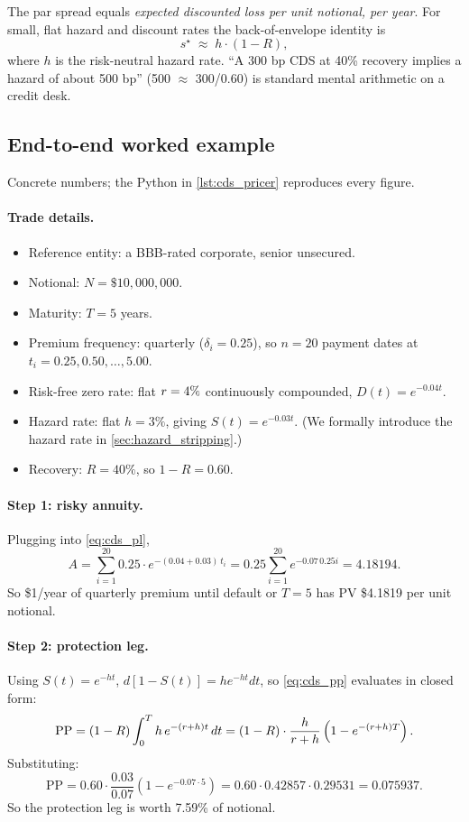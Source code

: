 \begin{intuitionbox}
The par spread equals \emph{expected discounted loss per unit
notional, per year}.  For small, flat hazard and discount rates the
back-of-envelope identity is
\[
  s^\star \;\approx\; h \cdot (1 - R),
\]
where $h$ is the risk-neutral hazard rate.  ``A 300 bp CDS at 40\%
recovery implies a hazard of about 500 bp'' (500 $\approx$ 300/0.60)
is standard mental arithmetic on a credit desk.
\end{intuitionbox}


\subsection{End-to-end worked example}
\label{sec:cds_worked}

Concrete numbers; the Python in \cref{lst:cds_pricer} reproduces
every figure.

\paragraph{Trade details.}
\begin{itemize}
  \item Reference entity: a BBB-rated corporate, senior unsecured.
  \item Notional: $N = \$10{,}000{,}000$.
  \item Maturity: $T = 5$ years.
  \item Premium frequency: quarterly ($\delta_i = 0.25$), so
    $n = 20$ payment dates at $t_i = 0.25, 0.50, \ldots, 5.00$.
  \item Risk-free zero rate: flat $r = 4\%$ continuously compounded,
    $D(t) = e^{-0.04 t}$.
  \item Hazard rate: flat $h = 3\%$, giving
    $S(t) = e^{-0.03 t}$.  (We formally introduce the hazard rate in
    \cref{sec:hazard_stripping}.)
  \item Recovery: $R = 40\%$, so $1 - R = 0.60$.
\end{itemize}

\paragraph{Step 1: risky annuity.}
Plugging into \cref{eq:cds_pl},
\[
  A = \sum_{i=1}^{20} 0.25 \cdot e^{-(0.04 + 0.03)\, t_i}
    = 0.25 \sum_{i=1}^{20} e^{-0.07\, 0.25 i}
    = 4.18194.
\]
So \$1/year of quarterly premium until default or $T=5$ has PV
\$4.1819 per unit notional.

\paragraph{Step 2: protection leg.}
Using $S(t) = e^{-h t}$, $d[1 - S(t)] = h e^{-h t} dt$, so
\cref{eq:cds_pp} evaluates in closed form:
\[
  \mathrm{PP}
  = (1 - R)\int_0^T h \, e^{-(r + h)t}\, dt
  = (1 - R) \cdot \frac{h}{r + h}\left(1 - e^{-(r + h) T}\right).
\]
Substituting:
\[
  \mathrm{PP}
  = 0.60 \cdot \frac{0.03}{0.07}\left(1 - e^{-0.07 \cdot 5}\right)
  = 0.60 \cdot 0.42857 \cdot 0.29531
  = 0.075937.
\]
So the protection leg is worth 7.59\% of notional.

